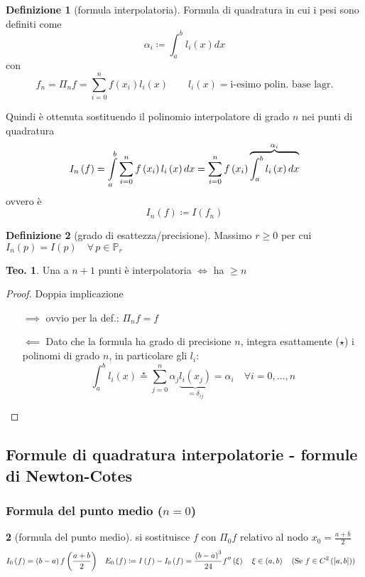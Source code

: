 \documentclass[a4paper,10pt]{article}
\theoremstyle{definition}
\theoremstyle{indentdefinition}
\newtheorem{defn}{Definizione}[section]
\theoremstyle{indenttheorem}
\newtheorem{thm}{Teo.}
\theoremstyle{myremark}
\theoremstyle{indentgeneral}
\newtheorem{lyxalgorithm}[thm]{\protect\algorithmname}
\theoremstyle{plain}
\theoremstyle{plain}
\newenvironment{myboxed} 
{\noindent\begin{lrbox}{\mybox}\begin{minipage}{\textwidth}}
{\end{minipage}\end{lrbox}\fbox{\usebox{\mybox}}}
\begin{document}
\begin{defn}[formula interpolatoria] Formula di quadratura in cui i pesi sono definiti come 
$$\boxed{\alpha_i\coloneqq\int_a^bl_i(x)dx}$$
con $$f_n=\Pi_nf=\sum_{i=0}^{n}f(x_i)l_i(x)\quad\quad l_i(x)=\text{i-esimo polin. base lagr.}$$

Quindi è ottenuta sostituendo il polinomio interpolatore di grado $n$ nei
punti di quadratura
\[
I_{n}\left(f\right)=\intop_{a}^{b}\sum_{i=0}^{n}f\left(x_{i}\right)l_{i}\left(x\right)dx=\sum_{i=0}^{n}f\left(x_{i}\right)\overset{\alpha_{i}}{\overbrace{\int_{a}^{b}l_{i}\left(x\right)dx}}
\]
ovvero è $$I_n(f)\coloneqq I(f_n)$$

\end{defn}

\begin{defn}[grado di esattezza/precisione]
\label{def:grado-di-esattezza}Massimo $r\geq0$ per cui $I_{n}\left(p\right)=I\left(p\right)\quad\forall\,p\in\mathbb{P}_{r}$ 
\end{defn}

\begin{myboxed}
\begin{thm}
Una  a $n+1$ punti è interpolatoria
$\Longleftrightarrow$ ha  $\geq n$
\end{thm}
\end{myboxed}
\begin{proof}Doppia implicazione
\begin{itemize}
    \item[$\implies$] ovvio per la def.: $\Pi_nf=f$
    \item[$\impliedby$] Dato che la formula ha grado di precisione $n$, integra esattamente ($\star$) i polinomi di grado $n$, in particolare gli $l_i$:
    $$\int_a^bl_i(x)\overset{\star}{=}\sum_{j=0}^n\alpha_j\underbrace{l_i(x_j)}_{=\delta_{ij}}=\alpha_i \quad \forall i=0,\dots,n$$
\end{itemize}
\end{proof}

\subsection{Formule di quadratura interpolatorie - formule di Newton-Cotes}
\subsubsection{Formula del punto medio ($n=0$)}
\begin{lyxalgorithm}[formula del punto medio] 
\label{def:formula-punto-medio} si sostituisce $f$ con $\Pi_0f$ relativo al nodo $x_0=\frac{a+b}{2}$
\begin{align*}
I_{0}\left(f\right) & =\left(b-a\right)f\left(\frac{a+b}{2}\right) & E_{0}\left(f\right) & \coloneqq I\left(f\right)-I_{0}\left(f\right)=\frac{\left(b-a\right)^{3}}{24}f^{\prime\prime}\left(\xi\right)\quad\xi\in\left(a,b\right)\quad\text{(Se \ensuremath{f\in C^{2}\left(\left[a,b\right]\right)})}
\end{align*}
\end{lyxalgorithm}
\end{document}
